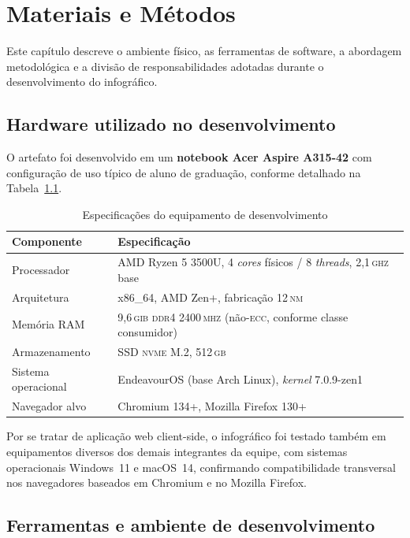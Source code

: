 \chapter{Materiais e Métodos}
\label{cap:metodologia}

Este capítulo descreve o ambiente físico, as ferramentas de software,
a abordagem metodológica e a divisão de responsabilidades adotadas
durante o desenvolvimento do infográfico.

\section{Hardware utilizado no desenvolvimento}
\label{sec:hardware}

O artefato foi desenvolvido em um \textbf{notebook Acer Aspire A315-42}
com configuração de uso típico de aluno de graduação, conforme
detalhado na Tabela~\ref{tab:hw}.

\begin{table}[h!]
\centering
\caption{Especificações do equipamento de desenvolvimento}
\label{tab:hw}
\begin{tabular}{lp{8.5cm}}
\toprule
\textbf{Componente} & \textbf{Especificação} \\
\midrule
Processador & AMD Ryzen 5 3500U, 4 \emph{cores} físicos / 8
              \emph{threads}, 2,1\,\textsc{ghz} base \\
Arquitetura  & x86\_64, AMD Zen+, fabricação 12\,\textsc{nm} \\
Memória RAM  & 9,6\,\textsc{gib} \textsc{ddr4} 2400\,\textsc{mhz}
               (não-\textsc{ecc}, conforme classe consumidor) \\
Armazenamento & SSD \textsc{nvme} M.2, 512\,\textsc{gb} \\
Sistema operacional & EndeavourOS (base Arch Linux),
                      \emph{kernel} 7.0.9-zen1 \\
Navegador alvo & Chromium 134+, Mozilla Firefox 130+ \\
\bottomrule
\end{tabular}
\end{table}

Por se tratar de aplicação web client-side, o infográfico foi
testado também em equipamentos diversos dos demais integrantes da
equipe, com sistemas operacionais Windows~11 e macOS~14, confirmando
compatibilidade transversal nos navegadores baseados em Chromium e
no Mozilla Firefox.

\section{Ferramentas e ambiente de desenvolvimento}
\label{sec:ferramentas}

